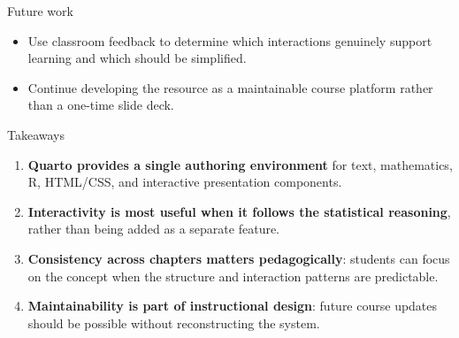 \documentclass[aspectratio=169,10pt]{beamer}
\begin{document}
\begin{frame}{Future work}
\vspace{0.6em}
\begin{center}
\end{center}

\vspace{1.0em}
\begin{itemize}
  \item Use classroom feedback to determine which interactions genuinely support learning and which should be simplified.
  \item Continue developing the resource as a maintainable course platform rather than a one-time slide deck.
\end{itemize}
\end{frame}

\begin{frame}{Takeaways}
\vspace{0.75em}
\begin{enumerate}
  \item \textbf{Quarto provides a single authoring environment} for text, mathematics, R, HTML/CSS, and interactive presentation components.
  \item \textbf{Interactivity is most useful when it follows the statistical reasoning}, rather than being added as a separate feature.
  \item \textbf{Consistency across chapters matters pedagogically}: students can focus on the concept when the structure and interaction patterns are predictable.
  \item \textbf{Maintainability is part of instructional design}: future course updates should be possible without reconstructing the system.
\end{enumerate}
\end{frame}
\end{document}
